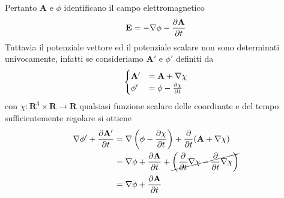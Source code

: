 \documentclass{article}
\begin{document}
Pertanto $\mathbf{A}$ e $\phi$ identificano il campo elettromagnetico 
\begin{align}
    \mathbf{E} = -\nabla\phi - \frac{\partial \mathbf{A}}{\partial t} \notag 
\end{align}
Tuttavia il potenziale vettore ed il potenziale scalare non sono determinati univocamente, infatti se consideriamo $\mathbf{A}'$ e $\phi'$ definiti da 
\begin{align}
    \begin{cases}
        \mathbf{A}' &= \mathbf{A} + \nabla\chi \\
    \phi' &= \phi - \frac{\partial\chi}{\partial t} 
    \end{cases} \notag
\end{align}
con $\chi : \mathbf{R}^3 \times \mathbf{R} \longrightarrow \mathbf{R}$ qualsiasi funzione scalare delle coordinate e del tempo sufficientemente regolare si ottiene 
\begin{align}
    \nabla\phi' + \frac{\partial \mathbf{A}'}{\partial t} &= \nabla\left(\phi - \frac{\partial\chi}{\partial t}\right) + \frac{\partial}{\partial t}(\mathbf{A} + \nabla\chi) \notag \\
    &= \nabla\phi + \frac{\partial \mathbf{A}}{\partial t} + \cancel{\left(\frac{\partial}{\partial t}\nabla\chi - \frac{\partial}{\partial t}\nabla\chi\right)} \notag \\
    &= \nabla\phi + \frac{\partial\mathbf{A}}{\partial t} \notag
\end{align}
\end{document}
